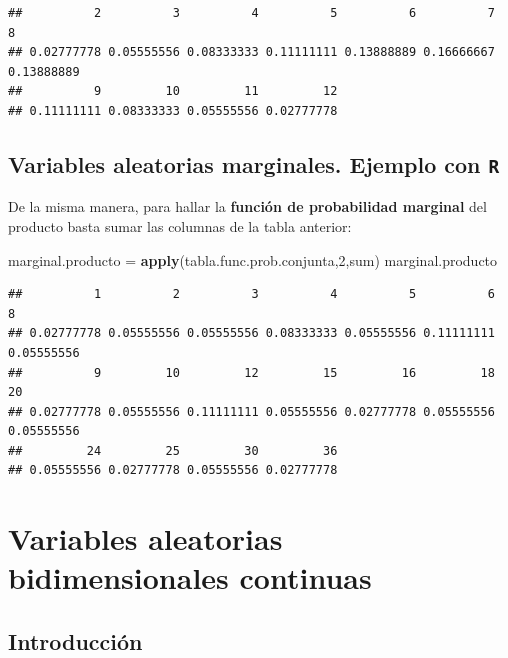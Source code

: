 \documentclass[]{book}
\newenvironment{Shaded}{\begin{snugshade}}{\end{snugshade}}
\newcommand{\DecValTok}[1]{\textcolor[rgb]{0.00,0.00,0.81}{#1}}
\newcommand{\KeywordTok}[1]{\textcolor[rgb]{0.13,0.29,0.53}{\textbf{#1}}}
\newcommand{\NormalTok}[1]{#1}
\newcommand{\StringTok}[1]{\textcolor[rgb]{0.31,0.60,0.02}{#1}}
\begin{document}
\begin{verbatim}
##          2          3          4          5          6          7          8 
## 0.02777778 0.05555556 0.08333333 0.11111111 0.13888889 0.16666667 0.13888889 
##          9         10         11         12 
## 0.11111111 0.08333333 0.05555556 0.02777778
\end{verbatim}

\hypertarget{variables-aleatorias-marginales.-ejemplo-con-r-1}{%
\subsection{\texorpdfstring{Variables aleatorias marginales. Ejemplo con \texttt{R}}{Variables aleatorias marginales. Ejemplo con R}}\label{variables-aleatorias-marginales.-ejemplo-con-r-1}}

De la misma manera, para hallar la \textbf{función de probabilidad marginal} del producto basta sumar las columnas de la tabla anterior:

\begin{Shaded}
\begin{Highlighting}[]
\NormalTok{marginal.producto =}\StringTok{ }\KeywordTok{apply}\NormalTok{(tabla.func.prob.conjunta,}\DecValTok{2}\NormalTok{,sum)}
\NormalTok{marginal.producto}
\end{Highlighting}
\end{Shaded}

\begin{verbatim}
##          1          2          3          4          5          6          8 
## 0.02777778 0.05555556 0.05555556 0.08333333 0.05555556 0.11111111 0.05555556 
##          9         10         12         15         16         18         20 
## 0.02777778 0.05555556 0.11111111 0.05555556 0.02777778 0.05555556 0.05555556 
##         24         25         30         36 
## 0.05555556 0.02777778 0.05555556 0.02777778
\end{verbatim}

\hypertarget{variables-aleatorias-bidimensionales-continuas}{%
\section{Variables aleatorias bidimensionales continuas}\label{variables-aleatorias-bidimensionales-continuas}}

\hypertarget{introducciuxf3n-5}{%
\subsection{Introducción}\label{introducciuxf3n-5}}
\end{document}
